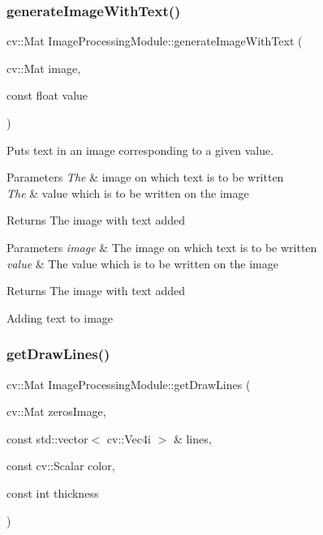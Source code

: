 \subsubsection{\texorpdfstring{generate\+Image\+With\+Text()}{generateImageWithText()}}
{\footnotesize\ttfamily cv\+::\+Mat Image\+Processing\+Module\+::generate\+Image\+With\+Text (\begin{DoxyParamCaption}\item[{cv\+::\+Mat}]{image,  }\item[{const float}]{value }\end{DoxyParamCaption})}



Puts text in an image corresponding to a given value. 


\begin{DoxyParams}{Parameters}
{\em The} & image on which text is to be written\\
\hline
{\em The} & value which is to be written on the image\\
\hline
\end{DoxyParams}
\begin{DoxyReturn}{Returns}
The image with text added
\end{DoxyReturn}

\begin{DoxyParams}{Parameters}
{\em image} & The image on which text is to be written\\
\hline
{\em value} & The value which is to be written on the image\\
\hline
\end{DoxyParams}
\begin{DoxyReturn}{Returns}
The image with text added 
\end{DoxyReturn}
Adding text to image \mbox{\label{class_image_processing_module_af42931725c6d342227de9cfb1b2b3a90}} 
\subsubsection{\texorpdfstring{get\+Draw\+Lines()}{getDrawLines()}}
{\footnotesize\ttfamily cv\+::\+Mat Image\+Processing\+Module\+::get\+Draw\+Lines (\begin{DoxyParamCaption}\item[{cv\+::\+Mat}]{zeros\+Image,  }\item[{const std\+::vector$<$ cv\+::\+Vec4i $>$ \&}]{lines,  }\item[{const cv\+::\+Scalar}]{color,  }\item[{const int}]{thickness }\end{DoxyParamCaption})}



